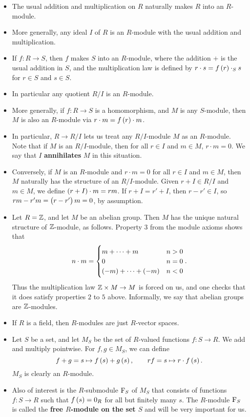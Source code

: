 \begin{example*}
\hfill
\begin{itemize}
\item The usual addition and multiplication on $ R $ naturally makes $ R $ into an $ R $-module.
\item More generally, any ideal $ I $ of $ R $ is an $ R $-module with the usual addition and multiplication.
\item If $ f : R \to S $, then $ f $ makes $ S $ into an $ R $-module, where the addition $ + $ is the usual addition in $ S $, and the multiplication law is defined by $ r \cdot s = f\br{r} \cdot_S s $ for $ r \in S $ and $ s \in S $.
\item In particular any quotient $ R / I $ is an $ R $-module.
\item More generally, if $ f : R \to S $ is a homomorphism, and $ M $ is any $ S $-module, then $ M $ is also an $ R $-module via $ r \cdot m = f\br{r} \cdot m $.
\item In particular, $ R \to R / I $ lets us treat any $ R / I $-module $ M $ as an $ R $-module. Note that if $ M $ is an $ R / I $-module, then for all $ r \in I $ and $ m \in M $, $ r \cdot m = 0 $. We say that $ I $ \textbf{annihilates} $ M $ in this situation.
\item Conversely, if $ M $ is an $ R $-module and $ r \cdot m = 0 $ for all $ r \in I $ and $ m \in M $, then $ M $ naturally has the structure of an $ R / I $-module. Given $ r + I \in R / I $ and $ m \in M $, we define $ \br{r + I} \cdot m = rm $.
If $ r + I = r' + I $, then $ r - r' \in I $, so $ rm - r'm = \br{r - r'}m = 0 $, by assumption.
\item Let $ R = \mathbb{Z} $, and let $ M $ be an abelian group. Then $ M $ has the unique natural structure of $ \mathbb{Z} $-module, as follows. Property $ 3 $ from the module axioms shows that
$$ n \cdot m =
\begin{cases}
m + \dots + m & n > 0 \\
0 & n = 0 \\
\br{-m} + \dots + \br{-m} & n < 0
\end{cases}.
$$
Thus the multiplication law $ \mathbb{Z} \times M \to M $ is forced on us, and one checks that it does satisfy properties $ 2 $ to $ 5 $ above. Informally, we say that abelian groups are $ \mathbb{Z} $-modules.
\item If $ R $ is a field, then $ R $-modules are just $ R $-vector spaces.
\item Let $ S $ be a set, and let $ M_S $ be the set of $ R $-valued functions $ f : S \to R $. We add and multiply pointwise. For $ f, g \in M_S $, we can define
$$ f + g = s \mapsto f\br{s} + g\br{s}, \qquad rf = s \mapsto r \cdot f\br{s}. $$
$ M_S $ is clearly an $ R $-module.
\item Also of interest is the $ R $-submodule $ \mathrm{F}_S $ of $ M_S $ that consists of functions $ f : S \to R $ such that $ f\br{s} = 0_R $ for all but finitely many $ s $. The $ R $-module $ \mathrm{F}_S $ is called the \textbf{free $ R $-module on the set $ S $} and will be very important for us.
\end{itemize}
\end{example*}

